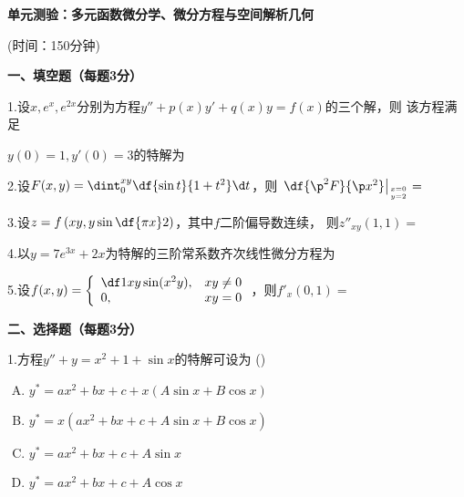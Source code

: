 \begin{center}
	{\Large\bf 单元测验：多元函数微分学、微分方程与空间解析几何}
	
	(时间：150分钟)
\end{center}

{\bf 一、填空题（每题3分）}

1.\;设$x,e^x,e^{2x}$分别为方程$y''+p(x)y'+q(x)y=f(x)$的三个解，则
该方程满足

\bigskip

\hspace{1em}$y(0)=1,y'(0)=3$的特解为\underline{\hspace{4cm}}

\bigskip

2.\;设$F(x,y)=\dint_0^{xy}\df{\sin t}{1+t^2}\d t$，则
$\left.\df{\p^2F}{\p x^2}\right|_{x=0 \atop y=2}=$\underline{\hspace{4cm}}

\bigskip

3.\;设$z=f\left(xy,y\sin\df{\pi x}2\right)$，其中$f$二阶偏导数连续，
则$z''_{xy}(1,1)=$\underline{\hspace{4cm}}

\bigskip

4.\;以$y=7e^{3x}+2x$为特解的三阶常系数齐次线性微分方程为\underline{\hspace{4cm}}

\bigskip

5.\;设$f(x,y)=\left\{\begin{array}{ll}
	\df1{xy}\sin(x^2y),& xy\ne 0\\
	0,& xy=0
\end{array}\right.$，则$f'_x(0,1)=$\underline{\hspace{4cm}}

\bigskip

{\bf 二、选择题（每题3分）}

1.\;方程$y''+y=x^2+1+\sin x$的特解可设为
  (\underline{\hspace{1cm}})
  \begin{enumerate}[(A)]
  \setlength{\itemindent}{3em}
    \item $y^*=ax^2+bx+c+x(A\sin x+B\cos x)$
    \item $y^*=x(ax^2+bx+c+A\sin x+B\cos x)$
    \item $y^*=ax^2+bx+c+A\sin x$
    \item $y^*=ax^2+bx+c+A\cos x$
  \end{enumerate}

